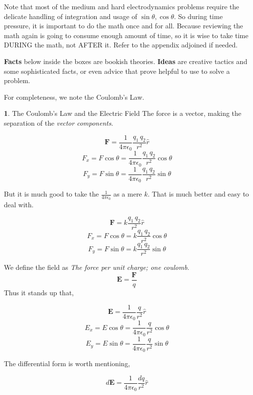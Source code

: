 \documentclass[11pt,a4paper,twocolumn,openright]{article}
\renewcommand{\vec}[1]{\boldsymbol{#1}}
\theoremstyle{definition}
\newtheorem{fct}{ \framebox[0.05\textwidth]{{\sffamily Fact}} }
\theoremstyle{definition}
\theoremstyle{definition}
\theoremstyle{definition}
\begin{document}





Note that most of the medium and hard electrodynamics problems require the delicate handling of integration and usage of $\sin \theta, \cos \theta$. So during time pressure, it is important to do the math once and for all. Because reviewing the math again is going to consume enough amount of time, so it is wise to take time DURING the math, not AFTER it. Refer to the appendix adjoined if needed.

\textbf{Facts} below inside the boxes are bookish theories. \textbf{Ideas} are creative tactics and some sophisticated facts, or even advice that prove helpful to use to solve a problem.

For completeness, we note the Coulomb's Law.


\begin{fct}
\textsf{The Coulomb's Law and the Electric Field}
%
The force is a vector, making the separation of the \emph{vector components}.


\[ \vec{F} = \frac{1}{4 \pi \epsilon_0} \frac{q_1 \, q_2}{r^2} \hat{r} \]
\[ F_x = F \cos \theta  = \frac{1}{4 \pi \epsilon_0} \frac{q_1 \, q_2}{r^2} \cos \theta \]
\[ F_y = F \sin \theta = \frac{1}{4 \pi \epsilon_0} \frac{q_1 \, q_2}{r^2} \sin \theta \]

But it is much good to take the $\frac{1}{4 \pi \epsilon_0}$ as a mere $k$. That is much better and easy to deal with.

\[ \vec{F} = k \frac{q_1 \, q_2}{r^2} \hat{r} \]
\[ F_x = F \cos \theta  = k \frac{q_1 \, q_2}{r^2} \cos \theta \]
\[ F_y = F \sin \theta = k \frac{q_1 \, q_2}{r^2} \sin \theta \]

We define the field as \emph{The force per unit charge; one coulomb}.
\[ \vec{E} = \frac{\vec{F}}{q} \]
Thus it stands up that, 

\[ \vec{E} = \frac{1}{4 \pi \epsilon_0} \frac{q}{r^2} \hat{r} \]
\[ E_x = E \cos \theta  = \frac{1}{4 \pi \epsilon_0} \frac{q}{r^2} \cos \theta \]
\[ E_y = E \sin \theta = \frac{1}{4 \pi \epsilon_0} \frac{q}{r^2} \sin \theta \]

The differential form is worth mentioning,

\[ d\vec{E} = \frac{1}{4 \pi \epsilon_0} \frac{dq}{r^2} \hat{r} \] 

\end{fct}
\end{document}

